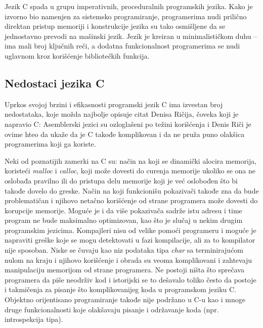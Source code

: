 \documentclass[a4paper]{article}
\begin{document}
{Jezik C spada u grupu imperativnih, proceduralnih programskih jezika. Kako je izvorno bio namenjen za sistemsko programiranje, programerima nudi prilično direktan pristup memoriji i konstrukcije jezika su tako osmišljene da se jednostavno prevodi na mašinski jezik. Jezik je kreiran u minimalističkom duhu -- ima mali broj ključnih reči, a dodatna funkcionalnost programerima se nudi uglavnom kroz korišćenje bibliotečkih funkcija.

\subsection{Nedostaci jezika C}
Uprkos svojoj brzini i efikasnosti programski jezik C ima izvestan broj nedostataka, koje možda najbolje opisuje citat Denisa Ričija, čoveka koji je napravio C:  Asemblerski jezici su ozloglašeni po težini korišćenja i Denis Riči je ovime hteo da ukaže da je C takođe komplikovan i da ne pruža puno olakšica programerima koji ga koriste.

Neki od poznatijih zamerki na C su: način na koji se dinamički alocira memorija, koristeći {\em malloc} i {\em calloc}, koji može dovesti do curenja memorije ukoliko se ona ne oslobađa pravilno ili do pristupa delu memorije koji je već oslobođen što bi takođe dovelo do greske. Način na koji funkcionišu pokazivači takođe zna da bude problematičan i njihovo netačno korišćenje od strane programera može dovesti do korupcije memorije. Moguće je i da više pokazivača sadrže istu adresu i time program ne bude maksimalno optimizovan, kao što je slučaj u nekim drugim programskim jezicima. Kompajleri nisu od velike pomoći programeru i moguće je napraviti greške koje se mogu detektovati u fazi kompilacije, ali za to kompilator nije sposoban. Niske se čuvaju kao niz podataka tipa {\em char} sa terminirajućom nulom na kraju i njihovo korišćenje i obrada su veoma komplikovani i zahtevaju manipulaciju memorijom od strane programera. Ne postoji ništa što sprečava programera da piše neodrživ kod i istorijski se to dešavalo toliko često da postoje i takmičenja za pisanje što komplikovanijeg koda u programskom jeziku C. Objektno orijentisano programiranje takođe nije podržano u C-u kao i mnoge druge funkcionalnosti koje olakšavaju pisanje i održavanje koda (npr. introspekcija tipa).

}
\end{document}
